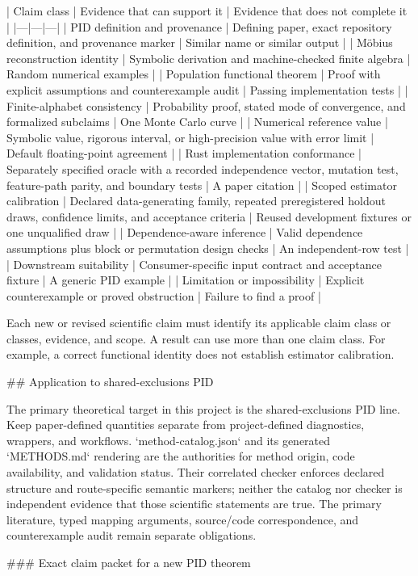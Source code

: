 \documentclass[11pt]{article}
\begin{document}
\begin{markdown}
| Claim class | Evidence that can support it | Evidence that does not complete it |
|---|---|---|
| PID definition and provenance | Defining paper, exact repository definition, and provenance marker | Similar name or similar output |
| Möbius reconstruction identity | Symbolic derivation and machine-checked finite algebra | Random numerical examples |
| Population functional theorem | Proof with explicit assumptions and counterexample audit | Passing implementation tests |
| Finite-alphabet consistency | Probability proof, stated mode of convergence, and formalized subclaims | One Monte Carlo curve |
| Numerical reference value | Symbolic value, rigorous interval, or high-precision value with error limit | Default floating-point agreement |
| Rust implementation conformance | Separately specified oracle with a recorded independence vector, mutation test, feature-path parity, and boundary tests | A paper citation |
| Scoped estimator calibration | Declared data-generating family, repeated preregistered holdout draws, confidence limits, and acceptance criteria | Reused development fixtures or one unqualified draw |
| Dependence-aware inference | Valid dependence assumptions plus block or permutation design checks | An independent-row test |
| Downstream suitability | Consumer-specific input contract and acceptance fixture | A generic PID example |
| Limitation or impossibility | Explicit counterexample or proved obstruction | Failure to find a proof |

Each new or revised scientific claim must identify its applicable claim class or classes, evidence,
and scope. A result can use more than one claim class. For example, a correct functional identity
does not establish estimator calibration.

## Application to shared-exclusions PID

The primary theoretical target in this project is the shared-exclusions PID line. Keep
paper-defined quantities separate from project-defined diagnostics, wrappers, and workflows.
`method-catalog.json` and its generated `METHODS.md` rendering
are the authorities for method origin, code availability, and validation status.
Their correlated checker enforces declared structure and route-specific semantic markers; neither
the catalog nor checker is independent evidence that those scientific statements are true. The
primary literature, typed mapping arguments, source/code correspondence, and counterexample audit
remain separate obligations.

### Exact claim packet for a new PID theorem


\end{markdown}
\end{document}
